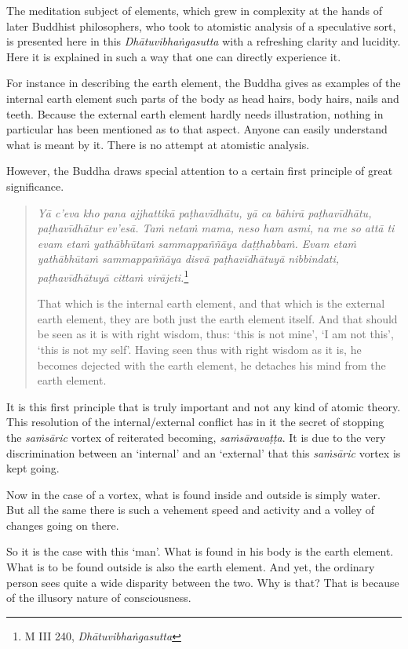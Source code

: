 The meditation subject of elements, which grew in complexity at the hands of later Buddhist philosophers, who took to atomistic analysis of a speculative sort, is presented here in this \emph{Dhātuvibhaṅgasutta} with a refreshing clarity and lucidity. Here it is explained in such a way that one can directly experience it.

For instance in describing the earth element, the Buddha gives as examples of the internal earth element such parts of the body as head hairs, body hairs, nails and teeth. Because the external earth element hardly needs illustration, nothing in particular has been mentioned as to that aspect. Anyone can easily understand what is meant by it. There is no attempt at atomistic analysis.

However, the Buddha draws special attention to a certain first principle of great significance.

\begin{quote}
\emph{Yā c'eva kho pana ajjhattikā paṭhavīdhātu, yā ca bāhirā paṭhavīdhātu, paṭhavīdhātur ev'esā. Taṁ netaṁ mama, neso ham asmi, na me so attā ti evam etaṁ yathābhūtaṁ sammappaññāya daṭṭhabbaṁ. Evam etaṁ yathābhūtaṁ sammappaññāya disvā paṭhavīdhātuyā nibbindati, paṭhavīdhātuyā cittaṁ virājeti.}\footnote{M III 240, \emph{Dhātuvibhaṅgasutta}}

That which is the internal earth element, and that which is the external earth element, they are both just the earth element itself. And that should be seen as it is with right wisdom, thus: `this is not mine', `I am not this', `this is not my self'. Having seen thus with right wisdom as it is, he becomes dejected with the earth element, he detaches his mind from the earth element.
\end{quote}

It is this first principle that is truly important and not any kind of atomic theory. This resolution of the internal/external conflict has in it the secret of stopping the \emph{saṁsāric} vortex of reiterated becoming, \emph{saṁsāravaṭṭa}. It is due to the very discrimination between an `internal' and an `external' that this \emph{saṁsāric} vortex is kept going.

Now in the case of a vortex, what is found inside and outside is simply water. But all the same there is such a vehement speed and activity and a volley of changes going on there.

So it is the case with this `man'. What is found in his body is the earth element. What is to be found outside is also the earth element. And yet, the ordinary person sees quite a wide disparity between the two. Why is that? That is because of the illusory nature of consciousness.

